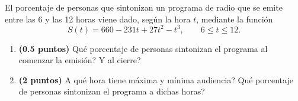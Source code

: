 
El porcentaje de personas que sintonizan un programa de radio que se emite entre las 6 y las 12 horas viene dado, según la hora $t$, mediante la función
\[
S(t)=660-231t+27t^2-t^3,\qquad6\leq t\leq12.
\]
\begin{enumerate}[label=\alph*)]
\item \textbf{(0.5 puntos)} \textquestiondown{}Qué porcentaje de personas sintonizan el programa al comenzar la emisión? \textquestiondown{}Y al cierre?
\item \textbf{(2 puntos)} \textquestiondown{}A qué hora tiene máxima y mínima audiencia? \textquestiondown{}Qué porcentaje de personas sintonizan el programa a dichas horas?
\end{enumerate}
